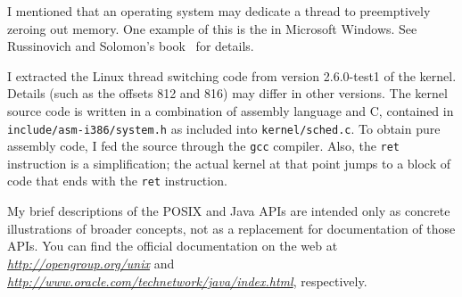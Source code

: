 I mentioned that an operating system may dedicate a thread to
preemptively zeroing out memory.  One example of this is the  in Microsoft Windows.  See
Russinovich and Solomon's
book~\cite{max981} for details.

I extracted the Linux thread switching code from version 2.6.0-test1
of the kernel.  Details (such as the offsets 812 and 816) may differ
in other versions.  The kernel source code is written in a combination
of assembly language and C, contained in
\verb|include/asm-i386/system.h| as included into
\verb|kernel/sched.c|.  To obtain pure assembly code, I fed the
source through the \verb|gcc| compiler.  Also, the \verb|ret|
instruction is a simplification; the actual kernel at that point jumps
to a block of code that ends with the \verb|ret| instruction.

My brief descriptions of the POSIX and Java APIs are intended only as
concrete illustrations of broader concepts, not as a replacement for
documentation of those APIs.  You can find the official documentation
on the web at \textit{\url{http://opengroup.org/unix}}
and \textit{\url{http://www.oracle.com/technetwork/java/index.html}},
respectively.
